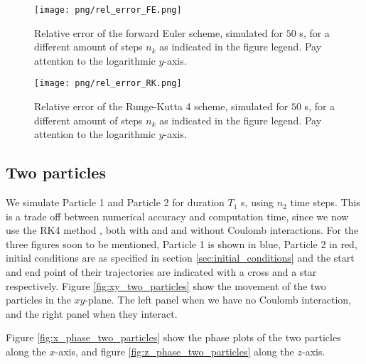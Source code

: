 \begin{figure}
    \texttt{[image: png/rel\_error\_FE.png]}
    \caption{Relative error of the forward Euler scheme, simulated for $50$ \textmu s, for a different amount of steps $n_k$ as indicated in the figure legend. Pay attention to the logarithmic $y$-axis.}
    \label{fig:error_FE}
\end{figure}


\begin{figure}
    \texttt{[image: png/rel\_error\_RK.png]}
    \caption{Relative error of the Runge-Kutta 4 scheme, simulated for $50$ \textmu s, for a different amount of steps $n_k$ as indicated in the figure legend. Pay attention to the logarithmic $y$-axis.}
    \label{fig:error_RK}
\end{figure}







\subsection{Two particles}\label{sec:two_particles}

We simulate Particle 1 and Particle 2 for duration $T_1$ \textmu s,  using $n_2$ time steps. This is a trade off between numerical accuracy and computation time, since we now use the RK4 method , both with and and without Coulomb interactions. For the three figures soon to be mentioned, Particle 1 is shown in blue, Particle 2 in red, initial conditions are as specified in section \ref{sec:initial_conditions} and the start and end point of their trajectories are indicated with a cross and a star respectively. Figure \ref{fig:xy_two_particles} show the movement of the two particles in the $xy$-plane. The left panel when we have no Coulomb interaction, and the right panel when they interact. 

Figure \ref{fig:x_phase_two_particles} show the phase plots of the two particles along the $x$-axis, and figure \ref{fig:z_phase_two_particles} along the $z$-axis.
\newpage
\onecolumngrid


